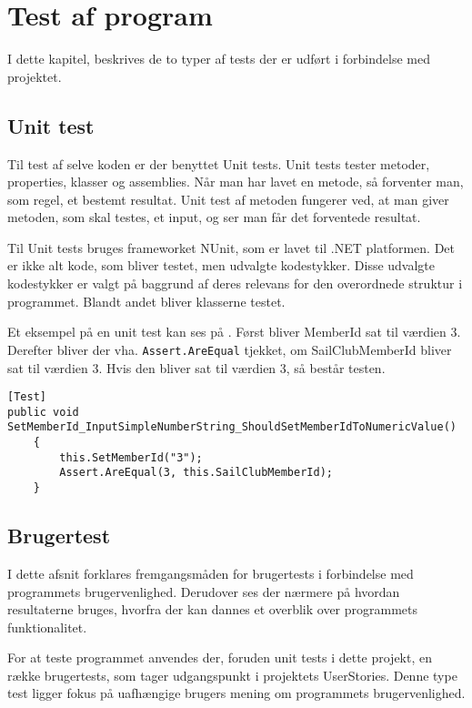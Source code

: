\chapter{Test af program}\label{test_af_program}
I dette kapitel, beskrives de to typer af tests der er udført i forbindelse med projektet.

\section{Unit test}
Til test af selve koden er der benyttet Unit tests.
Unit tests tester metoder, properties, klasser og assemblies. 
Når man har lavet en metode, så forventer man, som regel, et bestemt resultat.
Unit test af metoden fungerer ved, at man giver metoden, som skal testes, et input, og ser man får det forventede resultat.

Til Unit tests bruges frameworket NUnit, som er lavet til .NET platformen. 
Det er ikke alt kode, som bliver testet, men udvalgte kodestykker.
Disse udvalgte kodestykker er valgt på baggrund af deres relevans for den overordnede struktur i programmet. 
Blandt andet bliver klasserne testet.

Et eksempel på en unit test kan ses på .
Først bliver MemberId sat til værdien 3. 
Derefter bliver der vha. \texttt{Assert.AreEqual} tjekket, om SailClubMemberId bliver sat til værdien 3.
Hvis den bliver sat til værdien 3, så består testen.

\begin{lstlisting}[frame=single, caption=Eksempel på Unit test, label=unit_test]
[Test]
public void SetMemberId_InputSimpleNumberString_ShouldSetMemberIdToNumericValue()
	{
		this.SetMemberId("3");
		Assert.AreEqual(3, this.SailClubMemberId);
	}
\end{lstlisting}

\section{Brugertest}
I dette afsnit forklares fremgangsmåden for brugertests i forbindelse med programmets brugervenlighed.
Derudover ses der nærmere på hvordan resultaterne bruges, hvorfra der kan dannes et overblik over programmets funktionalitet. 

For at teste programmet anvendes der, foruden unit tests i dette projekt, en række brugertests, som tager udgangspunkt i projektets UserStories.
Denne type test ligger fokus på uafhængige brugers mening om programmets brugervenlighed.

